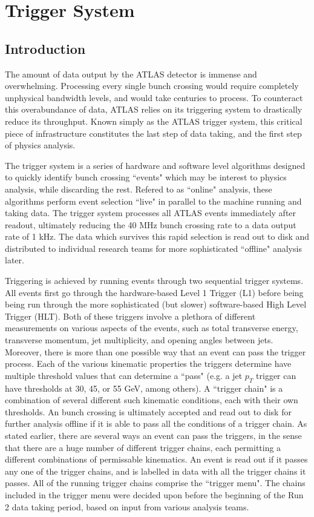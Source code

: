\chapter{Trigger System} %
\section{Introduction}
    The amount of data output by the ATLAS detector is immense and overwhelming.
    Processing every single bunch crossing would require completely unphysical bandwidth levels, and would take centuries to process.
    To counteract this overabundance of data, ATLAS relies on its triggering system to drastically reduce its throughput.
    Known simply as the ATLAS trigger system, this critical piece of infrastructure constitutes the last step of data taking, and the first step of physics analysis.

    The trigger system is a series of hardware and software level algorithms designed to quickly identify bunch crossing ``events" which may be interest to physics analysis, while discarding the rest.
    Refered to as ``online" analysis, these algorithms perform event selection ``live" in parallel to the machine running and taking data.
    The trigger system processes all ATLAS events immediately after readout, ultimately reducing the 40 MHz bunch crossing rate to a data output rate of 1 kHz.
    The data which survives this rapid selection is read out to disk and distributed to individual research teams for more sophisticated ``offline" analysis later.
    
    Triggering is achieved by running events through two sequential trigger systems.
    All events first go through the hardware-based Level 1 Trigger (L1) before being being run through the more sophisticated (but slower) software-based High Level Trigger (HLT).
    Both of these triggers involve a plethora of different measurements on various aspects of the events, such as total transverse energy, transverse momentum, jet multiplicity, and opening angles between jets.
    Moreover, there is more than one possible way that an event can pass the trigger process.
    Each of the various kinematic properties the triggers determine have multiple threshold values that can determine a ``pass" (e.g. a jet $p_T$ trigger can have thresholds at 30, 45, or 55 GeV, among others).
    A ``trigger chain" is a combination of several different such kinematic conditions, each with their own thresholds.
    An bunch crossing is ultimately accepted and read out to disk for further analysis offline if it is able to pass all the conditions of a trigger chain.
    As stated earlier, there are several ways an event can pass the triggers, in the sense that there are a huge number of different trigger chains, each permitting a different combinations of permissable kinematics.
    An event is read out if it passes any one of the trigger chains, and is labelled in data with all the trigger chains it passes.
    All of the running trigger chains comprise the ``trigger menu".
    The chains included in the trigger menu were decided upon before the beginning of the Run 2 data taking period, based on input from various analysis teams.


